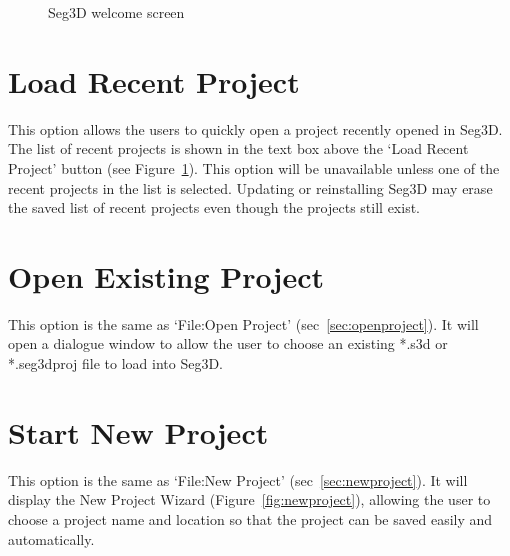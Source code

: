 \documentclass[fleqn,11pt,openany]{book}
\begin{document}
\begin{figure}
\caption{Seg3D welcome screen}\label{fig:welcome}
\end{figure}


\section{Load Recent Project}

This option allows the users to quickly open a project recently opened in Seg3D.  The list of recent projects is shown in the text box above the `Load Recent Project' button (see Figure~\ref{fig:welcome}).  This option will be unavailable unless one of the recent projects in the list is selected.  Updating or reinstalling Seg3D may erase the saved list of recent projects even though the projects still exist.  

\section{Open Existing Project}

This option is the same as `File:Open Project' (sec~\ref{sec:openproject}).  It will open a dialogue window to allow the user to choose an existing *.s3d or *.seg3dproj file to load into Seg3D.  

\section{Start New Project}

This option is the same as `File:New Project' (sec~\ref{sec:newproject}).  It will display the New Project Wizard (Figure~\ref{fig:newproject}), allowing the user to choose a project name and location so that the project can be saved easily and automatically.  
\end{document}
